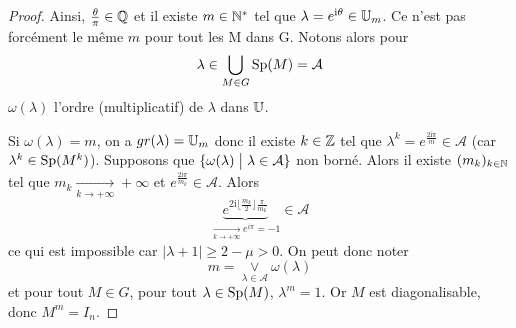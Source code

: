 \begin{proof}
	Ainsi, $\frac{\theta}{\pi}\in\mathbb{Q}$ et il existe $m\in\mathbb{N}^{*}$ tel que $\lambda=e^{\mathrm{i}\theta}\in\mathbb{U}_{m}$. Ce n'est pas forcément le même $m$ pour tout les M dans G. Notons alors pour 
	\begin{equation}\lambda\in\bigcup_{M\in G}\operatorname{Sp}(M)=\mathcal{A}\end{equation}
	$\omega(\lambda)$ l'ordre (multiplicatif) de $\lambda$ dans $\mathbb{U}$.

	Si $\omega(\lambda)=m$, on a $gr(\lambda)=\mathbb{U}_{m}$ donc il existe $k\in\mathbb{Z}$ tel que $\lambda^{k}=e^{\frac{2\mathrm{i}\pi}{m}}\in\mathcal{A}$ (car $\lambda^{k}\in\operatorname{Sp}(M^{k})$). Supposons que $\{\omega(\lambda)\bigm| \lambda\in\mathcal{A}\}$ non borné. Alors il existe $(m_{k})_{k\in\mathbb{N}}$ tel que $m_{k}\xrightarrow[k\to+\infty]{}+\infty$ et $e^{\frac{2\mathrm{i}\pi}{m_{k}}}\in\mathcal{A}$. Alors 
	\begin{equation}\underbrace{e^{2\mathrm{i}\lfloor\frac{m_{k}}{2}\rfloor \frac{\pi}{m_{k}}}}_{\xrightarrow[k\to+\infty]{} e^{i\pi}=-1}\in\mathcal{A}\end{equation}
	ce qui est impossible car $\vert\lambda+1\vert\geqslant2-\mu>0$. On peut donc noter
	\begin{equation}m=\underset{\lambda\in\mathcal{A}}{\vee}\omega(\lambda)\end{equation}
	et pour tout $M\in G$, pour tout $\lambda\in\operatorname{Sp}(M)$, $\lambda^{m}=1$. Or $M$ est diagonalisable, donc $M^{m}=I_{n}$.
\end{proof}

